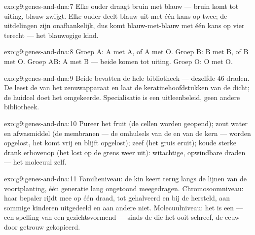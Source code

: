 \begin{solution}{exo:g9:genes-and-dna:7}
Elke ouder draagt bruin met blauw --- bruin komt tot uiting,
blauw zwijgt. Elke ouder deelt blauw uit met één kans op twee;
de uitdelingen zijn onafhankelijk, dus komt blauw-met-blauw met
één kans op vier terecht --- het blauwogige kind.
\end{solution}

\begin{solution}{exo:g9:genes-and-dna:8}
Groep A: A met A, of A met O. Groep B: B met B, of B met O.
Groep AB: A met B --- beide komen tot uiting. Groep O: O met
O.
\end{solution}

\begin{solution}{exo:g9:genes-and-dna:9}
Beide bevatten de hele bibliotheek --- dezelfde 46 draden. De
 leest de  van het zenuwapparaat en laat de
keratinehoofdstukken van de  dicht; de huidcel doet het
omgekeerde. Specialisatie is een uitleenbeleid, geen andere
bibliotheek.
\end{solution}

\begin{solution}{exo:g9:genes-and-dna:10}
Pureer het fruit (de cellen worden geopend); zout water en
afwasmiddel (de membranen --- de omhulsels van de  en van de
kern --- worden opgelost, het  komt vrij en blijft opgelost);
zeef (het gruis eruit); koude sterke drank erbovenop (het 
lost op de grens weer uit): witachtige, opwindbare draden --- het
molecuul zelf.
\end{solution}

\begin{solution}{exo:g9:genes-and-dna:11}
Familieniveau: de kin keert terug langs de lijnen van de
voortplanting, één generatie lang ongetoond meegedragen.
Chromosoomniveau: haar bepaler rijdt mee op één draad, tot
 gehalveerd en bij de  hersteld, aan
sommige kinderen uitgedeeld en aan andere niet. Molecuulniveau:
het is een  --- een spelling van een gezichtsvormend  ---
sinds de  die het ooit schreef, de eeuw door getrouw
gekopieerd.
\end{solution}

